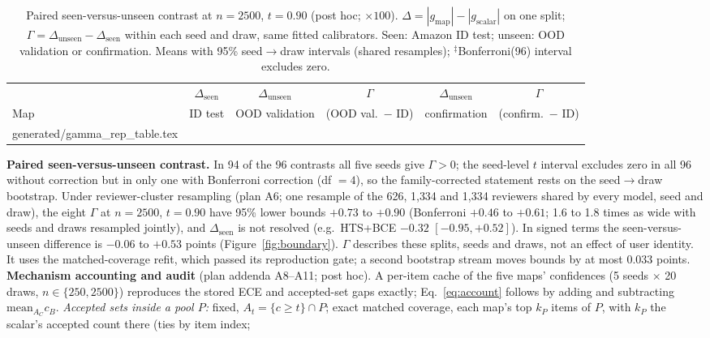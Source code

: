 \documentclass[sigconf,anonymous,review]{acmart}
\makeatletter
\newcommand{\tablerows}[1]{\@@input #1.tex }
\makeatother
\begin{document}
\begin{table}
\centering\footnotesize
\setlength{\tabcolsep}{3pt}
\caption{Paired seen-versus-unseen contrast at $n{=}2500$, $t{=}0.90$
(post hoc; $\times100$). $\Delta=|g_{\text{map}}|-|g_{\text{scalar}}|$ on
one split; $\Gamma=\Delta_{\text{unseen}}-\Delta_{\text{seen}}$ within each
seed and draw, same fitted calibrators. Seen: Amazon ID test; unseen: OOD validation or confirmation. Means with
95\% seed$\to$draw intervals (shared resamples); $^\ddagger$Bonferroni(96)
interval excludes zero.}
\label{tab:gamma}
\begin{tabular}{lccccc}
\toprule
& $\Delta_{\text{seen}}$ & $\Delta_{\text{unseen}}$ & $\Gamma$ &
$\Delta_{\text{unseen}}$ & $\Gamma$\\
Map & ID test & OOD validation & (OOD val.\ $-$ ID) & confirmation &
(confirm.\ $-$ ID)\\
\midrule
\tablerows{generated/gamma_rep_table}
\bottomrule
\end{tabular}
\end{table}
\textbf{Paired seen-versus-unseen contrast.} In 94 of the 96 contrasts all
five seeds give $\Gamma>0$; the seed-level $t$ interval excludes zero in
all 96 without correction but in only one with Bonferroni correction
(df $=4$), so the family-corrected statement rests on the seed$\to$draw
bootstrap. Under reviewer-cluster resampling (plan A6; one resample of the 626,
1{,}334 and 1{,}334 reviewers shared by every model, seed and draw), the
eight $\Gamma$ at $n{=}2500$, $t{=}0.90$ have 95\% lower bounds $+0.73$ to
$+0.90$ (Bonferroni $+0.46$ to $+0.61$; 1.6 to 1.8 times as wide with
seeds and draws resampled jointly), and $\Delta_{\text{seen}}$ is not
resolved (e.g.\ HTS+BCE $-0.32$ $[-0.95,+0.52]$). In signed terms the
seen-versus-unseen difference is $-0.06$ to $+0.53$ points
(Figure~\ref{fig:boundary}). $\Gamma$ describes these
splits, seeds and draws, not an effect of user identity. It uses the matched-coverage refit, which passed its reproduction gate; a second bootstrap stream moves bounds by at most $0.033$
points. 
\textbf{Mechanism accounting and audit} (plan addenda A8--A11; post
hoc). A per-item cache of the five maps' confidences (5 seeds $\times$ 20
draws, $n\in\{250,2500\}$) reproduces the stored ECE and accepted-set gaps
exactly; Eq.~\eqref{eq:account} follows by adding and subtracting
$\mathrm{mean}_{A_C}c_B$. \emph{Accepted sets inside a pool $P$:} fixed,
$A_t=\{c\ge t\}\cap P$; exact matched coverage, each map's top $k_P$ items
of $P$, with $k_P$ the scalar's accepted count there (ties by item index;
\end{document}
